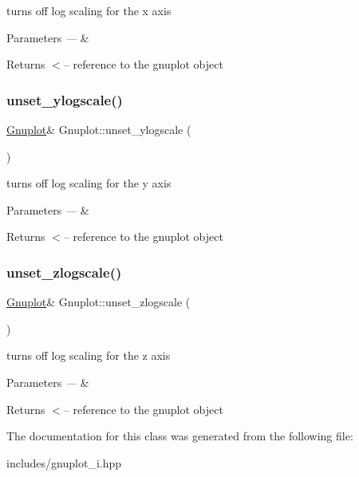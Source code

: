 turns off log scaling for the x axis


\begin{DoxyParams}{Parameters}
{\em ---} & \\
\hline
\end{DoxyParams}
\begin{DoxyReturn}{Returns}
$<$-- reference to the gnuplot object 
\end{DoxyReturn}
\mbox{\label{class_gnuplot_a9217543dd49c4802b1194d42c5e10b6d}} 
\subsubsection{\texorpdfstring{unset\+\_\+ylogscale()}{unset\_ylogscale()}}
{\footnotesize\ttfamily \hyperlink{class_gnuplot}{Gnuplot}\& Gnuplot\+::unset\+\_\+ylogscale (\begin{DoxyParamCaption}{ }\end{DoxyParamCaption})\hspace{0.3cm}{\ttfamily [inline]}}

turns off log scaling for the y axis


\begin{DoxyParams}{Parameters}
{\em ---} & \\
\hline
\end{DoxyParams}
\begin{DoxyReturn}{Returns}
$<$-- reference to the gnuplot object 
\end{DoxyReturn}
\mbox{\label{class_gnuplot_afa67f022ca344593b054d7f2e3406c7e}} 
\subsubsection{\texorpdfstring{unset\+\_\+zlogscale()}{unset\_zlogscale()}}
{\footnotesize\ttfamily \hyperlink{class_gnuplot}{Gnuplot}\& Gnuplot\+::unset\+\_\+zlogscale (\begin{DoxyParamCaption}{ }\end{DoxyParamCaption})\hspace{0.3cm}{\ttfamily [inline]}}

turns off log scaling for the z axis


\begin{DoxyParams}{Parameters}
{\em ---} & \\
\hline
\end{DoxyParams}
\begin{DoxyReturn}{Returns}
$<$-- reference to the gnuplot object 
\end{DoxyReturn}


The documentation for this class was generated from the following file\+:\begin{DoxyCompactItemize}
\item 
includes/gnuplot\+\_\+i.\+hpp\end{DoxyCompactItemize}
